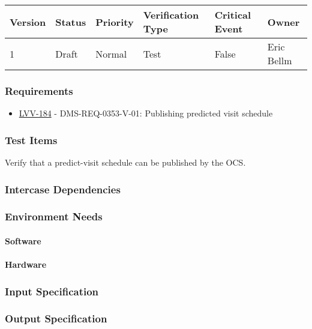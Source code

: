 \begin{longtable}[]{llllll}
\toprule
Version & Status & Priority & Verification Type & Critical Event & Owner
\\\midrule
1 & Draft & Normal &
Test & False & Eric Bellm
\\\bottomrule
\end{longtable}

\subsubsection{Requirements}
\begin{itemize}
\item \href{https://jira.lsstcorp.org/browse/LVV-184}{LVV-184} - DMS-REQ-0353-V-01: Publishing predicted visit schedule
\end{itemize}

\subsubsection{Test Items}
Verify that a predict-visit schedule can be published by the OCS.



\subsubsection{Intercase Dependencies}

\subsubsection{Environment Needs}

\paragraph{Software}

\paragraph{Hardware}

\subsubsection{Input Specification}

\subsubsection{Output Specification}

